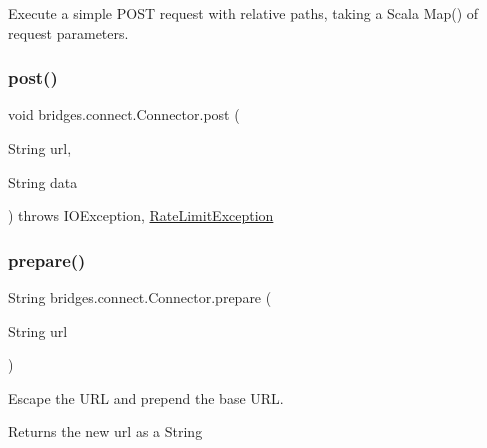Execute a simple P\+O\+ST request with relative paths, taking a Scala Map() of request parameters. \hypertarget{classbridges_1_1connect_1_1_connector_ad1384f2afce76b32e0a465d94e1af213}{}\label{classbridges_1_1connect_1_1_connector_ad1384f2afce76b32e0a465d94e1af213} 
\subsubsection{\texorpdfstring{post()}{post()}\hspace{0.1cm}{\footnotesize\ttfamily [2/2]}}
{\footnotesize\ttfamily void bridges.\+connect.\+Connector.\+post (\begin{DoxyParamCaption}\item[{String}]{url,  }\item[{String}]{data }\end{DoxyParamCaption}) throws I\+O\+Exception,  								\hyperlink{classbridges_1_1validation_1_1_rate_limit_exception}{Rate\+Limit\+Exception}}

\hypertarget{classbridges_1_1connect_1_1_connector_a507ee5a9d8c812ffd4629cbd22f27373}{}\label{classbridges_1_1connect_1_1_connector_a507ee5a9d8c812ffd4629cbd22f27373} 
\subsubsection{\texorpdfstring{prepare()}{prepare()}}
{\footnotesize\ttfamily String bridges.\+connect.\+Connector.\+prepare (\begin{DoxyParamCaption}\item[{String}]{url }\end{DoxyParamCaption})}

Escape the U\+RL and prepend the base U\+RL. \begin{DoxyReturn}{Returns}
the new url as a String 
\end{DoxyReturn}
\hypertarget{classbridges_1_1connect_1_1_connector_aa0201e2569358ff906d3c14d654711e5}{}\label{classbridges_1_1connect_1_1_connector_aa0201e2569358ff906d3c14d654711e5} 
